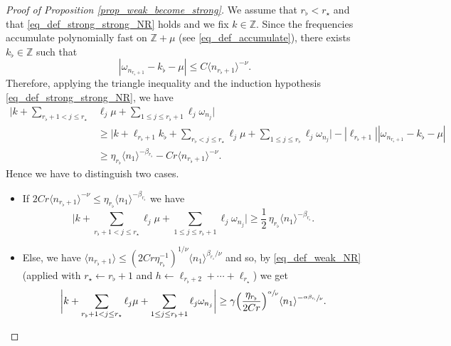\documentclass[JEP,XML,SOM,Unicode,NoEqCountersInSection,published]{cedram}
\theoremstyle{definition}
\begin{document}
\begin{proof}[Proof of Proposition \ref{prop_weak_become_strong}]
We assume that $r_\flat < r_\star$ and that \eqref{eq_def_strong_strong_NR} holds and we fix $k\in \mathbb{Z}$.
Since the frequencies accumulate polynomially fast on $\mathbb{Z} + \mu$ (see \eqref{eq_def_accumulate}), there exists $k_\flat \in \mathbb{Z}$ such that
\[
|\omega_{n_{r_\flat +1} } - k_\flat-\mu|\leq C \langle n_{r_\flat +1} \rangle^{-\nu}.
\]
Therefore, applying the triangle inequality and the induction hypothesis \eqref{eq_def_strong_strong_NR}, we have
\begin{equation*}
\begin{split}
\biggl| k + \sum_{{r_{\flat}+1} <j \leq r_\star} &\ell_j \mu + \sum_{1\leq j \leq {r_{\flat}+1} }\ell_j \omega_{n_j} \biggr| \\
&\geq \biggl| k + \ell_{r_\flat+1} k_\flat + \sum_{r_{\flat} <j \leq r_\star} \ell_j \mu + \sum_{1\leq j \leq r_{\flat} }\ell_j \omega_{n_j} \biggr| - |\ell_{r_\flat+1}| |\omega_{n_{r_\flat +1} } - k_\flat -\mu| \\
&\geq \eta_{r_\flat} \langle n_{1} \rangle^{-\beta_{r_\flat}} -C r \langle n_{r_\flat +1} \rangle^{-\nu}.
\end{split}
\end{equation*}
Hence we have to distinguish two cases.
\begin{itemize}
\item
If $2 Cr \langle n_{r_\flat +1} \rangle^{-\nu} \leq \eta_{r_\flat} \langle n_{1} \rangle^{-\beta_{r_\flat}}$ we have
\[
\biggl| k + \sum_{{r_{\flat}+1} <j \leq r_\star} \ell_j \mu + \sum_{1\leq j \leq {r_{\flat}+1} }\ell_j \omega_{n_j} \biggr|\geq \frac12\, \eta_{r_\flat} \langle n_{1} \rangle^{-\beta_{r_\flat}}.
\]
\item
Else, we have $\langle n_{r_\flat +1} \rangle \leq (2Cr\eta_{r_\flat}^{-1})^{1/\nu} \langle n_{1} \rangle^{\beta_{r_\flat}/\nu}$ and so, by \eqref{eq_def_weak_NR} (applied with $r_\star \leftarrow r_\flat+1$ and $h\leftarrow \ell_{r_{\flat}+2} + \cdots + \ell_{r_\star}$) we get
\[
\biggl| k + \sum_{{r_{\flat}+1} <j \leq r_\star} \ell_j \mu + \sum_{1\leq j \leq {r_{\flat}+1} }\ell_j \omega_{n_j} \biggr| \geq \gamma \Big(\frac{\eta_{r_\flat}}{2Cr}\Big)^{\sfrac{\alpha}{\nu}} \langle n_{1} \rangle^{-\sfrac{\alpha\beta_{r_\flat}}{\nu}}.\qedhere
\]
\end{itemize}
\end{proof}
\end{document}
